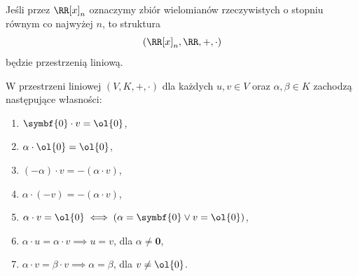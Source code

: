 \begin{example}
    Jeśli przez $\RR[x]_n$ oznaczymy zbiór wielomianów rzeczywistych o stopniu równym co najwyżej $n$, to struktura \[(\RR[x]_n, \RR, +, \cdot)\]
    będzie przestrzenią liniową.
\end{example}

\begin{theorem}
    W przestrzeni liniowej $(V, K, +, \cdot)$ dla każdych $u, v \in V$ oraz $\alpha, \beta \in K$ zachodzą następujące własności:
    \begin{enumerate}
        \item $\symbf{0} \cdot v = \ol{0}$,
        \item $\alpha \cdot \ol{0} = \ol{0}$,
        \item $(-\alpha) \cdot v = - (\alpha \cdot v)$,
        \item $\alpha \cdot (-v) = - (\alpha \cdot v)$,
        \item $\alpha \cdot v = \ol{0} \iff (\alpha = \symbf{0} \lor v = \ol{0})$,
        \item $\alpha \cdot u = \alpha \cdot v \implies u = v$, dla $\alpha \neq \symbf{0}$,
        \item $\alpha \cdot v = \beta \cdot v \implies \alpha = \beta$, dla $v \neq \ol{0}$.
    \end{enumerate}
\end{theorem}

